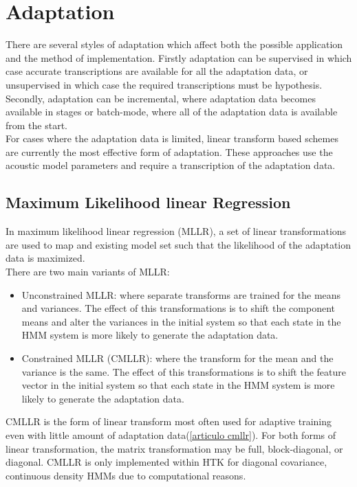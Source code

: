 \section{Adaptation}\label{badapt}
There are several styles of adaptation which affect both the possible application and the method of implementation. Firstly adaptation can be supervised in which case accurate transcriptions are available for all the adaptation data, or unsupervised in which case the required transcriptions must be hypothesis. Secondly, adaptation can be incremental, where adaptation data becomes available in stages or batch-mode, where all of the adaptation data is available from the start.\\
For cases where the adaptation data is limited, linear transform based schemes are currently the most effective form of adaptation. These approaches use the acoustic model parameters and require a transcription of the adaptation data.
\subsection{Maximum Likelihood linear Regression}\label{mllr}
In maximum likelihood linear regression (MLLR), a set of linear transformations are used to map and existing model set such that the likelihood of the adaptation data is maximized. \\
There are two main variants of MLLR:
\begin{itemize}
	\item Unconstrained MLLR: where separate transforms are trained for the means and variances. The effect of this transformations is to shift the component means and alter the variances in the initial system so that each state in the HMM system is more likely to generate the adaptation data.
	\item Constrained MLLR (CMLLR): where the transform for the mean and the variance is the same. The effect of this transformations is to shift the feature vector  in the initial system so that each state in the HMM system is more likely to generate the adaptation data.
\end{itemize}
CMLLR is the form of linear transform most often used for adaptive training even with little amount of adaptation data(\ref{articulo cmllr}). For both forms of linear transformation, the matrix transformation may be full, block-diagonal, or diagonal. CMLLR  is only implemented within HTK for diagonal covariance, continuous density HMMs due to computational reasons.

